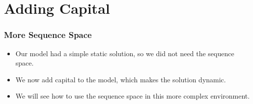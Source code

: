 \documentclass[english,xcolor=svgnames]{beamer}
\begin{document}


\section{Adding Capital}

\begin{frame}
    \frametitle{More Sequence Space}
    \begin{itemize}
        \item Our model had a simple static solution, so we did not need the sequence space.
        \item We now add capital to the model, which makes the solution dynamic.
        \item We will see how to use the sequence space in this more complex environment.
	\end{itemize}
\end{frame}
\end{document}
